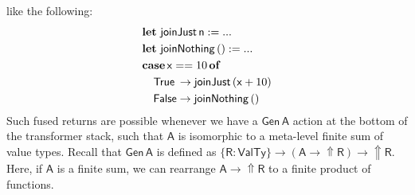 \documentclass[acmsmall,screen,review,anonymous]{acmart}
\newcommand{\mit}[1]{{\mathsf{#1}}}
\newcommand{\msf}[1]{{\mathsf{#1}}}
\newcommand{\mbf}[1]{{\mathbf{#1}}}
\newcommand{\ind}{\hspace{1em}}
\newcommand{\of}{\mbf{of}\,}
\newcommand{\letdef}{\mbf{let\,}}
\newcommand{\vn}{\mathsf{n}}
\newcommand{\vA}{\mathsf{A}}
\newcommand{\vR}{\mathsf{R}}
\newcommand{\vx}{\mathsf{x}}
\newcommand{\case}{\mbf{case\,}}
\newcommand{\Up}{{\Uparrow}}
\newcommand{\VTy}{\msf{ValTy}}
\newcommand{\True}{\msf{True}}
\newcommand{\False}{\msf{False}}
\theoremstyle{remark}
\newcommand{\Gen}{\msf{Gen}}
\begin{document}
like the following:
\begin{alignat*}{3}
  & \letdef\,\mit{joinJust}\,\vn := ...\\
  & \letdef\,\mit{joinNothing}\,() := ...\\
  & \case \vx == 10\,\of\\
  & \ind \True \hspace{0.2em}\to \mit{joinJust}\,(\vx + 10) \\
  & \ind \False \to \mit{joinNothing}\,()
\end{alignat*}
Such fused returns are possible whenever we have a $\Gen\,\vA$ action at the
bottom of the transformer stack, such that $\vA$ is isomorphic to a meta-level
finite sum of value types. Recall that $\Gen\,\vA$ is defined as $\{\vR : \VTy\} \to
(\vA \to \Up \vR) \to \Up \vR$. Here, if $\vA$ is a finite sum, we can rearrange $\vA \to
\Up \vR$ to a finite product of functions.
\end{document}
